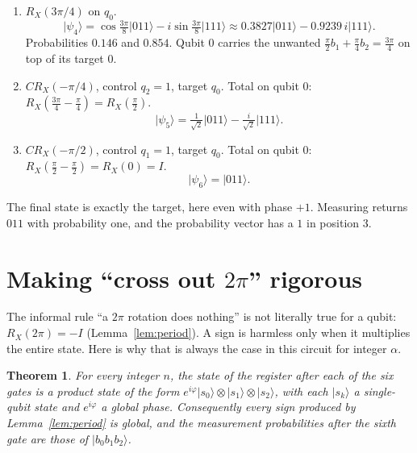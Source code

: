 \documentclass[11pt,a4paper]{article}
\newcommand{\ket}[1]{\lvert #1 \rangle}
\newcommand{\RX}{R_X}
\newcommand{\CRX}{CR_X}
\theoremstyle{plain}
\newtheorem{theorem}[lemma]{Theorem}
\theoremstyle{definition}
\theoremstyle{remark}
\begin{document}
\begin{enumerate}[label=\textbf{Gate \arabic*.},leftmargin=2.1cm,itemsep=5pt]
\item $\RX(3\pi/4)$ on $q_0$.
      \[\ket{\psi_4} = \cos\tfrac{3\pi}{8}\ket{011} - i\sin\tfrac{3\pi}{8}\ket{111}
                     \approx 0.3827\ket{011} - 0.9239\,i\ket{111}.\]
      Probabilities $0.146$ and $0.854$. Qubit 0 carries the unwanted
      $\frac{\pi}{2}b_1 + \frac{\pi}{4}b_2 = \frac{3\pi}{4}$ on top of its target $0$.
\item $\CRX(-\pi/4)$, control $q_2 = 1$, target $q_0$. Total on qubit 0: $\RX(\tfrac{3\pi}{4} - \tfrac{\pi}{4}) = \RX(\tfrac{\pi}{2})$.
      \[\ket{\psi_5} = \tfrac{1}{\sqrt2}\ket{011} - \tfrac{i}{\sqrt2}\ket{111}.\]
\item $\CRX(-\pi/2)$, control $q_1 = 1$, target $q_0$. Total on qubit 0: $\RX(\tfrac{\pi}{2} - \tfrac{\pi}{2}) = \RX(0) = I$.
      \[\ket{\psi_6} = \ket{011}.\]
\end{enumerate}
The final state is exactly the target, here even with phase $+1$. Measuring returns $011$ with
probability one, and the probability vector has a $1$ in position $3$.

\section{Making ``cross out $2\pi$'' rigorous}\label{sec:rigor}

The informal rule ``a $2\pi$ rotation does nothing'' is not literally true for a qubit:
$\RX(2\pi) = -I$ (Lemma~\ref{lem:period}). A sign is harmless only when it multiplies the entire
state. Here is why that is always the case in this circuit for integer $\alpha$.

\begin{theorem}\label{thm:product}
For every integer $n$, the state of the register after each of the six gates is a product state
of the form $e^{i\varphi}\ket{s_0}\otimes\ket{s_1}\otimes\ket{s_2}$, with each $\ket{s_k}$ a
single-qubit state and $e^{i\varphi}$ a global phase. Consequently every sign produced by
Lemma~\ref{lem:period} is global, and the measurement probabilities after the sixth gate are those
of $\ket{b_0b_1b_2}$.
\end{theorem}
\end{document}
